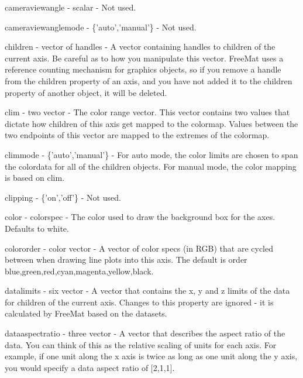 \begin{DoxyItemize}
\item {\ttfamily cameraviewangle} -\/ {\ttfamily scalar} -\/ Not used.  
\item {\ttfamily cameraviewanglemode} -\/ {\ttfamily \{'auto','manual'\}} -\/ Not used.  
\item {\ttfamily children} -\/ {\ttfamily vector of handles} -\/ A vector containing handles to children of the current axis. Be careful as to how you manipulate this vector. Free\-Mat uses a reference counting mechanism for graphics objects, so if you remove a handle from the {\ttfamily children} property of an axis, and you have not added it to the {\ttfamily children} property of another object, it will be deleted.  
\item {\ttfamily clim} -\/ {\ttfamily two vector} -\/ The color range vector. This vector contains two values that dictate how children of this axis get mapped to the colormap. Values between the two endpoints of this vector are mapped to the extremes of the colormap.  
\item {\ttfamily climmode} -\/ {\ttfamily \{'auto','manual'\}} -\/ For {\ttfamily auto} mode, the color limits are chosen to span the colordata for all of the children objects. For {\ttfamily manual} mode, the color mapping is based on {\ttfamily clim}.  
\item {\ttfamily clipping} -\/ {\ttfamily \{'on','off'\}} -\/ Not used.  
\item {\ttfamily color} -\/ {\ttfamily colorspec} -\/ The color used to draw the background box for the axes. Defaults to white.  
\item {\ttfamily colororder} -\/ {\ttfamily color vector} -\/ A vector of color specs (in R\-G\-B) that are cycled between when drawing line plots into this axis. The default is order blue,green,red,cyan,magenta,yellow,black.  
\item {\ttfamily datalimits} -\/ {\ttfamily six vector} -\/ A vector that contains the x, y and z limits of the data for children of the current axis. Changes to this property are ignored -\/ it is calculated by Free\-Mat based on the datasets.  
\item {\ttfamily dataaspectratio} -\/ {\ttfamily three vector} -\/ A vector that describes the aspect ratio of the data. You can think of this as the relative scaling of units for each axis. For example, if one unit along the x axis is twice as long as one unit along the y axis, you would specify a data aspect ratio of {\ttfamily \mbox{[}2,1,1\mbox{]}}.  

\end{DoxyItemize}

